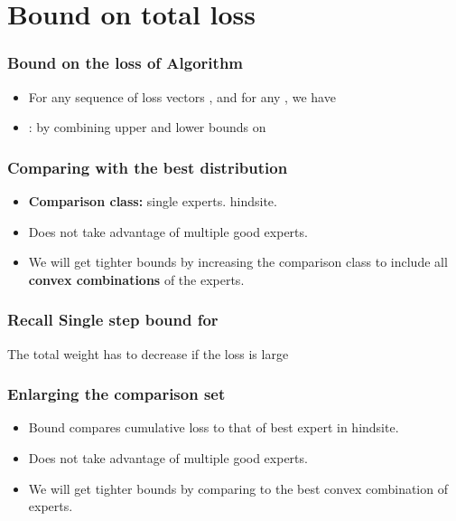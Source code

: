 \documentclass[handout]{beamer}
\begin{document}
\section{Bound on total loss}
\begin{frame}
\frametitle{Bound on the loss of \ouralg Algorithm}
\begin{itemize}
\item
\begin{theorem} \label{thm:basic-bnd}
For any sequence of loss vectors ,
and for any , we have
\end{theorem}
\item
{}: by combining upper and lower bounds on 
\end{itemize}
\end{frame}


\begin{frame}
  \frametitle{Comparing with the best distribution}
  \begin{itemize}
  \item {\bf Comparison class:} single experts.
    hindsite.
  \item Does not take advantage of multiple good experts.
  \item We will get tighter bounds by increasing the comparison class
    to include all {\bf convex combinations} of the experts.
  \end{itemize}
\end{frame}

\begin{frame}
\frametitle{Recall Single step bound for \ouralg}
The total weight has to decrease if the loss is large
\end{frame}

\begin{frame}
  \frametitle{Enlarging the comparison set}
  \begin{itemize}
  \item Bound compares cumulative loss to that of best expert in
    hindsite.
  \item Does not take advantage of multiple good experts.
  \item We will get tighter bounds by comparing to the best convex
    combination of experts.
  \end{itemize}
\end{frame}
\end{document}
